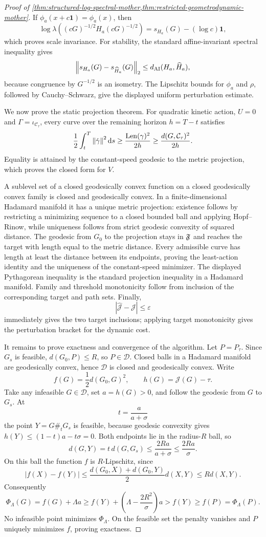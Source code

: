 \begin{proof}[Proof of
\cref{thm:structured-log-spectral-mother,thm:restricted-geometrodynamic-mother}]
If \(\phi_a(x+c\mathbf1)=\phi_a(x)\), then
\[
  \log\lambda((cG)^{-1/2}H_a(cG)^{-1/2})
  =s_{H_a}(G)-(\log c)\mathbf1,
\]
which proves scale invariance. For stability, the standard affine-invariant
spectral inequality gives
\[
  \left\lVert s_{H_a}(G)-s_{\widehat H_a}(G)\right\rVert_2
  \le
  d_{\mathrm{AI}}(H_a,\widehat H_a),
\]
because congruence by \(G^{-1/2}\) is an isometry. The Lipschitz bounds for
\(\phi_a\) and \(\rho\), followed by Cauchy--Schwarz, give the displayed
uniform perturbation estimate.

  We now prove the static projection theorem.  For quadratic kinetic action,
  \(U=0\) and
\(\Gamma=\iota_{\mathcal C_\tau}\), every curve over the
remaining horizon \(h=T-t\) satisfies
\[
  \frac12\int_t^T\left\lVert \dot\gamma\right\rVert^2\mathrm d s
  \ge\frac{\operatorname{Len}(\gamma)^2}{2h}
  \ge\frac{d(G,\mathcal C_\tau)^2}{2h}.
\]
Equality is attained by the constant-speed geodesic to the metric projection,
which proves the closed form for \(V\).

A sublevel set of a closed geodesically convex function on a closed
geodesically convex family is closed
and geodesically convex. In a finite-dimensional Hadamard manifold it has a
unique metric projection: existence follows by restricting a minimizing
sequence to a closed bounded ball and applying Hopf--Rinow, while uniqueness
follows from strict geodesic convexity of squared distance. The geodesic from
\(G_0\) to the projection stays in \(\mathfrak F\) and reaches the target with length
equal to the metric distance. Every admissible curve has length at least the
distance between its endpoints, proving the least-action identity and the
uniqueness of the constant-speed minimizer. The displayed Pythagorean
inequality is the standard projection inequality in a Hadamard manifold.
Family and threshold monotonicity follow from inclusion of the corresponding
target and path sets. Finally,
\[
  |\widehat{\mathcal J}-\mathcal J|\le\varepsilon
\]
immediately gives the two target inclusions; applying target monotonicity gives
the perturbation bracket for the dynamic cost.

It remains to prove exactness and convergence of the algorithm. Let
\(P=P_\tau\). Since \(G_s\) is feasible,
\(d(G_0,P)\le R\), so \(P\in\mathcal D\). Closed balls in a Hadamard
manifold are geodesically convex, hence \(\mathcal D\) is closed and
geodesically convex. Write
\[
  f(G)=\frac12d(G_0,G)^2,
  \qquad h(G)=\mathcal J(G)-\tau.
\]
Take any infeasible \(G\in\mathcal D\), set \(a=h(G)>0\), and follow the
geodesic from \(G\) to \(G_s\). At
\[
  t=\frac{a}{a+\sigma}
\]
the point \(Y=G\#_tG_s\) is feasible, because geodesic convexity gives
\(h(Y)\le(1-t)a-t\sigma=0\). Both endpoints lie in the radius-\(R\) ball, so
\[
  d(G,Y)
  =t\,d(G,G_s)
  \le\frac{2Ra}{a+\sigma}
  \le\frac{2Ra}{\sigma}.
\]
On this ball the function \(f\) is \(R\)-Lipschitz, since
\[
  |f(X)-f(Y)|
  \le
  \frac{d(G_0,X)+d(G_0,Y)}{2}d(X,Y)
  \le R d(X,Y).
\]
Consequently
\[
  \Phi_\Lambda(G)
  =f(G)+\Lambda a
  \ge
  f(Y)+\left(\Lambda-\frac{2R^2}{\sigma}\right)a
  >f(Y)\ge f(P)=\Phi_\Lambda(P).
\]
No infeasible point minimizes \(\Phi_\Lambda\). On the feasible set the
penalty vanishes and \(P\) uniquely minimizes \(f\), proving exactness.


\end{proof}
